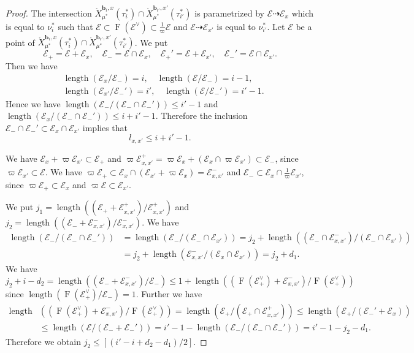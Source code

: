 \documentclass[10pt,a4paper]{amsart}
\newcommand{\bfb}{\mathbf{b}}
\newcommand{\cE}{\mathcal{E}}
\DeclareMathOperator{\length}{length}
\DeclareMathOperator{\oF}{F}
\begin{document}
\begin{proof}
The intersection 
$\mathring{X}_{\mu^*}^{\bfb_i,x}(\tau_i^*) \cap
 \mathring{X}_{\mu^*}^{\bfb_{i'},x'}(\tau_{i'}^*)$ 
is parametrized by 
$\cE \dashrightarrow \cE_x$ which is equal to 
$\nu_i^*$ such that 
$\cE \subset \oF (\cE^{\vee}) \subset \frac{1}{\varpi} \cE$ 
and 
$\cE \dashrightarrow \cE_{x'}$ 
is equal to $\nu_{i'}^*$. 
Let $\cE$ be a point of 
$\mathring{X}_{\mu^*}^{\bfb_i,x}(\tau_i^*) \cap \mathring{X}_{\mu^*}^{\bfb_{i'},x'}(\tau_{i'}^*)$. 
We put 
\[
 \cE_+=\cE +\cE_x, \quad 
 \cE_-=\cE \cap \cE_x, \quad 
 \cE_+'=\cE +\cE_{x'}, \quad
 \cE_-'=\cE \cap \cE_{x'}. 
\]
Then we have 
\begin{align*}
&\length (\cE_x/\cE_-)=i, \quad 
\length (\cE/\cE_-)=i-1, \\ 
&\length (\cE_{x'}/\cE_-')= i', \quad 
\length (\cE/\cE_-') = i' -1. 
\end{align*}
Hence we have 
$\length(\cE_-/(\cE_- \cap \cE_-')) \leq i' -1$ and 
$\length (\cE_x/(\cE_- \cap \cE_-')) \leq i+i' -1$. 
Therefore the inclusion 
$\cE_- \cap \cE_-' \subset \cE_x \cap \cE_{x'}$ implies that 
\[
 l_{x,x'} \leq i+i' -1. 
\]

We have 
$\cE_x +\varpi \cE_{x'} \subset \cE_+$ and 
$\varpi \cE_{x,x'}^+ =\varpi \cE_x +(\cE_x \cap \varpi \cE_{x'}) \subset \cE_-$, 
since $\varpi \cE_{x'} \subset \cE$. 
We have 
$\varpi \cE_+ \subset \cE_x \cap (\cE_{x'}+\varpi \cE_x)=\cE_{x,x'}^-$ and  
$\cE_- \subset \cE_x \cap \frac{1}{\varpi} \cE_{x'}$, 
since $\varpi \cE_+ \subset \cE_x$ and 
$\varpi \cE \subset \cE_{x'}$. 

We put $j_1=\length ((\cE_+ +\cE_{x,x'}^+ )/ \cE_{x,x'}^+ )$ 
and $j_2=\length ((\cE_- +\cE_{x,x'}^- )/\cE_{x,x'}^- )$. 
We have 
\begin{align*}
 \length (\cE_- / (\cE_- \cap \cE_-')) 
 &=\length (\cE_- / (\cE_- \cap \cE_{x'})) 
 =j_2 +\length ((\cE_-\cap \cE_{x,x'}^-) / (\cE_- \cap \cE_{x'}))\\ 
 &=j_2 +\length (\cE_{x,x'}^-/ (\cE_x \cap \cE_{x'})) = j_2 +d_1. 
\end{align*}
We have 
\[
 j_2 +i-d_2 = \length ((\cE_- + \cE_{x,x'}^-)/\cE_-) 
 \leq 1+\length ((\oF (\cE_+^{\vee}) + \cE_{x,x'}^-)/\oF (\cE_+^{\vee}))
\] 
since $\length (\oF (\cE_+^{\vee})/\cE_-)=1$. 
Further we have 
\begin{align*}
 \length & ((\oF (\cE_+^{\vee}) + \cE_{x,x'}^-)/\oF (\cE_+^{\vee}))
 = \length (\cE_+ / (\cE_+ \cap \cE_{x,x'}^+)) 
 \leq \length (\cE_+ / (\cE_-' +\cE_x )) \\ 
 &\leq 
 \length (\cE / (\cE_- +\cE_-'))
 =  i'-1-\length (\cE_- / (\cE_- \cap \cE_-')) 
 =i'-1-j_2 -d_1. 
\end{align*}
Therefore we obtain 
$j_2  \leq  [(i'-i+d_2 -d_1 )/2]$. 


\end{proof}
\end{document}
